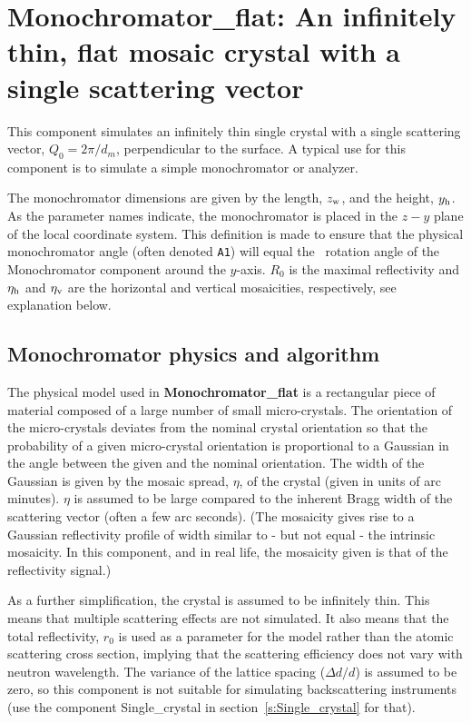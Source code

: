\section{Monochromator\_flat: An infinitely thin, flat mosaic crystal with
a single scattering vector}
\label{s:monochromator_flat}


This component simulates an infinitely thin single
crystal with a single scattering vector, $Q_0=2\pi / d_m$, perpendicular to the
surface. A typical
use for this component is to simulate a simple monochromator or analyzer.

The monochromator dimensions are given by the length, $z_{\rm w}$, and
the height, $y_{\rm h}$. As the parameter names indicate, the
monochromator is placed in the $z-y$ plane of the local coordinate system.
This definition is made to ensure that the physical monochromator angle
(often denoted \verb+A1+) will equal the \MCS\ rotation angle
of the Monochromator component around the $y$-axis.
$R_0$ is the maximal reflectivity and
$\eta_{\rm h}$ and $\eta_{\rm v}$ are the horizontal and vertical mosaicities,
respectively, see explanation below.

\subsection{Monochromator physics and algorithm}
The physical model used in {\bf Monochromator\_flat} is a rectangular piece of
material composed of a large number of small micro-crystals.
The orientation of the
micro-crystals deviates from the nominal crystal orientation so that the
probability of a given micro-crystal orientation is proportional to a
Gaussian in the angle between the given and the nominal orientation. The
width of the Gaussian is given by the mosaic spread, $\eta$, of the crystal
(given in units of arc minutes).
$\eta$ is assumed to be large compared to the inherent Bragg width of the
scattering vector (often a few arc seconds).
(The mosaicity gives rise to a Gaussian reflectivity profile of width
similar to - but not equal - the intrinsic mosaicity.
In this component, and in real life, the mosaicity given is that of the
reflectivity signal.)

As a further simplification, the crystal is assumed to be infinitely
thin. This means that multiple scattering effects are not simulated. It
also means that the total reflectivity, $r_0$ is used as a parameter for
the model rather than the atomic scattering cross section, implying that
the scattering efficiency does not vary with neutron wavelength.
The variance
of the lattice spacing ($\Delta d/d$) is assumed to be zero, so this
component is not suitable for simulating backscattering instruments (use
the component {\rm Single\_crystal}
in section~\ref{s:Single_crystal} for that).

